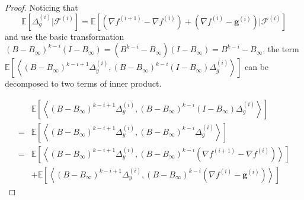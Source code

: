 \documentclass{article}
\newcommand{\vg}{{\mathbf{g}}}
\newcommand{\cF}{{\mathcal{F}}}
\newcommand{\EE}[1]{\mathbb{E}\left[#1\right]}
\newcommand{\ip}[1]{\left\langle#1\right\rangle}
\begin{document}
\begin{proof}

Noticing that 
$$\EE{\Delta_{g}^{(i)}|\cF^{(i)}}=\EE{(\nabla f^{(i+1)}-\nabla f^{(i)})+(\nabla f^{(i)}-\vg^{(i)})|\cF^{(i)}}$$
and use the basic transformation $(B-B_{\infty})^{k-i}(I-B_{\infty})=(B^{k-i}-B_{\infty})(I-B_{\infty})=B^{k-i}-B_{\infty}$, the term $\EE{\ip{(B-B_{\infty})^{k-i+1}\Delta_y^{(i)}, (B-B_{\infty})^{k-i}(I-B_{\infty})\Delta_g^{(i)}}}$ can be decomposed to two terms of inner product.

\begin{align*}
  &\EE{\ip{(B-B_{\infty})^{k-i+1}\Delta_y^{(i)}, (B-B_{\infty})^{k-i}(I-B_{\infty})\Delta_g^{(i)}}}\\
  =& \EE{\ip{(B-B_{\infty})^{k-i+1}\Delta_y^{(i)}, (B-B_{\infty})^{k-i}\Delta_g^{(i)}}}\\
  =& \EE{\ip{(B-B_{\infty})^{k-i+1}\Delta_y^{(i)}, (B-B_{\infty})^{k-i}(\nabla f^{(i+1)}-\nabla f^{(i)})}}\\&+\EE{\ip{(B-B_{\infty})^{k-i+1}\Delta_y^{(i)}, (B-B_{\infty})^{k-i}(\nabla f^{(i)}-\vg^{(i)})}}
\end{align*}


\end{proof}
\end{document}
